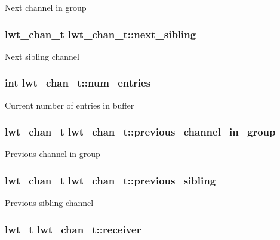 Next channel in group \hypertarget{structlwt__channel_a4b5e95b483446613dabd96de3dec4007}{
\subsubsection[{next\+\_\+sibling}]{\setlength{\rightskip}{0pt plus 5cm}lwt\+\_\+chan\+\_\+t lwt\+\_\+chan\+\_\+t\+::next\+\_\+sibling}}\label{structlwt__channel_a4b5e95b483446613dabd96de3dec4007}
Next sibling channel \hypertarget{structlwt__channel_a6d697010ea3cb8783ca62b526a9db6d1}{
\subsubsection[{num\+\_\+entries}]{\setlength{\rightskip}{0pt plus 5cm}int lwt\+\_\+chan\+\_\+t\+::num\+\_\+entries}}\label{structlwt__channel_a6d697010ea3cb8783ca62b526a9db6d1}
Current number of entries in buffer \hypertarget{structlwt__channel_a7b6ab62f05dfbb392a2c518f6d3b3e85}{
\subsubsection[{previous\+\_\+channel\+\_\+in\+\_\+group}]{\setlength{\rightskip}{0pt plus 5cm}lwt\+\_\+chan\+\_\+t lwt\+\_\+chan\+\_\+t\+::previous\+\_\+channel\+\_\+in\+\_\+group}}\label{structlwt__channel_a7b6ab62f05dfbb392a2c518f6d3b3e85}
Previous channel in group \hypertarget{structlwt__channel_a62840bc52e01e67e063776f8205dd43e}{
\subsubsection[{previous\+\_\+sibling}]{\setlength{\rightskip}{0pt plus 5cm}lwt\+\_\+chan\+\_\+t lwt\+\_\+chan\+\_\+t\+::previous\+\_\+sibling}}\label{structlwt__channel_a62840bc52e01e67e063776f8205dd43e}
Previous sibling channel \hypertarget{structlwt__channel_a740680d836200bfc87150333e4d62785}{
\subsubsection[{receiver}]{\setlength{\rightskip}{0pt plus 5cm}lwt\+\_\+t lwt\+\_\+chan\+\_\+t\+::receiver}}\label{structlwt__channel_a740680d836200bfc87150333e4d62785}

